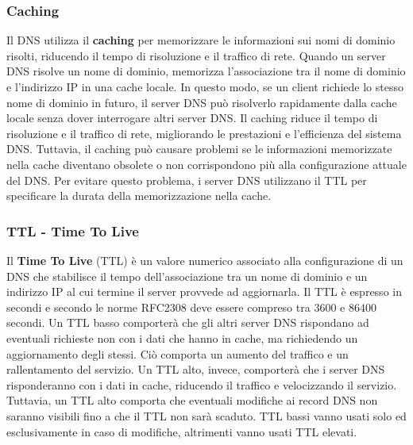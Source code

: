 \documentclass[12pt]{report}
\begin{document}
	\subsubsection{Caching}
	Il DNS utilizza il \textbf{caching} per memorizzare le informazioni sui nomi di dominio risolti, riducendo il tempo di risoluzione e il traffico di rete. Quando un server DNS risolve un nome di dominio, memorizza l'associazione tra il nome di dominio e l'indirizzo IP in una cache locale. In questo modo, se un client richiede lo stesso nome di dominio in futuro, il server DNS può risolverlo rapidamente dalla cache locale senza dover interrogare altri server DNS. Il caching riduce il tempo di risoluzione e il traffico di rete, migliorando le prestazioni e l'efficienza del sistema DNS. Tuttavia, il caching può causare problemi se le informazioni memorizzate nella cache diventano obsolete o non corrispondono più alla configurazione attuale del DNS. Per evitare questo problema, i server DNS utilizzano il TTL per specificare la durata della memorizzazione nella cache.

	\subsubsection{TTL - Time To Live}
	Il \textbf{Time To Live} (TTL) è un valore numerico associato alla configurazione di un DNS che stabilisce il tempo dell'associazione tra un nome di dominio e un indirizzo IP al cui termine il server provvede ad aggiornarla. Il TTL è espresso in secondi e secondo le norme RFC2308 deve essere compreso tra 3600 e 86400 secondi. Un TTL basso comporterà che gli altri server DNS rispondano ad eventuali richieste non con i dati che hanno in cache, ma richiedendo un aggiornamento degli stessi. Ciò comporta un aumento del traffico e un rallentamento del servizio. Un TTL alto, invece, comporterà che i server DNS risponderanno con i dati in cache, riducendo il traffico e velocizzando il servizio. Tuttavia, un TTL alto comporta che eventuali modifiche ai record DNS non saranno visibili fino a che il TTL non sarà scaduto. TTL bassi vanno usati solo ed esclusivamente in caso di modifiche, altrimenti vanno usati TTL elevati.
\end{document}
